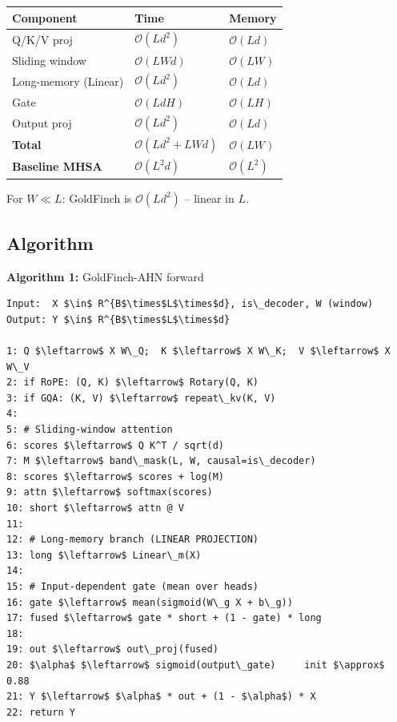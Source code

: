 \begin{table}[H]
\centering
\small
\begin{tabular}{lll}
\toprule
\textbf{Component} & \textbf{Time} & \textbf{Memory} \\
\midrule
Q/K/V proj & $\mathcal{O}(Ld^2)$ & $\mathcal{O}(Ld)$ \\
Sliding window & $\mathcal{O}(LWd)$ & $\mathcal{O}(LW)$ \\
Long-memory (Linear) & $\mathcal{O}(Ld^2)$ & $\mathcal{O}(Ld)$ \\
Gate & $\mathcal{O}(LdH)$ & $\mathcal{O}(LH)$ \\
Output proj & $\mathcal{O}(Ld^2)$ & $\mathcal{O}(Ld)$ \\
\textbf{Total} & $\mathcal{O}(Ld^2 + LWd)$ & $\mathcal{O}(LW)$ \\
\textbf{Baseline MHSA} & $\mathcal{O}(L^2 d)$ & $\mathcal{O}(L^2)$ \\
\bottomrule
\end{tabular}
\end{table}

For $W \ll L$: GoldFinch is $\mathcal{O}(L d^2)$ -- linear in $L$.

\subsection{Algorithm}

\textbf{Algorithm 1:} GoldFinch-AHN forward
\begin{lstlisting}
Input:  X $\in$ R^{B$\times$L$\times$d}, is\_decoder, W (window)
Output: Y $\in$ R^{B$\times$L$\times$d}

1: Q $\leftarrow$ X W\_Q;  K $\leftarrow$ X W\_K;  V $\leftarrow$ X W\_V
2: if RoPE: (Q, K) $\leftarrow$ Rotary(Q, K)
3: if GQA: (K, V) $\leftarrow$ repeat\_kv(K, V)
4:
5: # Sliding-window attention
6: scores $\leftarrow$ Q K^T / sqrt(d)
7: M $\leftarrow$ band\_mask(L, W, causal=is\_decoder)
8: scores $\leftarrow$ scores + log(M)
9: attn $\leftarrow$ softmax(scores)
10: short $\leftarrow$ attn @ V
11:
12: # Long-memory branch (LINEAR PROJECTION)
13: long $\leftarrow$ Linear\_m(X)
14:
15: # Input-dependent gate (mean over heads)
16: gate $\leftarrow$ mean(sigmoid(W\_g X + b\_g))
17: fused $\leftarrow$ gate * short + (1 - gate) * long
18:
19: out $\leftarrow$ out\_proj(fused)
20: $\alpha$ $\leftarrow$ sigmoid(output\_gate)     init $\approx$ 0.88
21: Y $\leftarrow$ $\alpha$ * out + (1 - $\alpha$) * X
22: return Y
\end{lstlisting}


